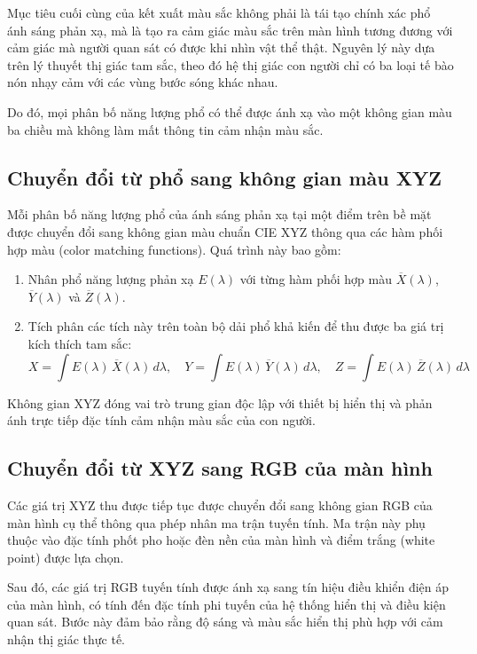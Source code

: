 Mục tiêu cuối cùng của kết xuất màu sắc không phải là tái tạo chính xác phổ ánh sáng phản xạ, mà là tạo ra cảm giác màu sắc trên màn hình tương đương với cảm giác mà người quan sát có được khi nhìn vật thể thật. Nguyên lý này dựa trên lý thuyết thị giác tam sắc, theo đó hệ thị giác con người chỉ có ba loại tế bào nón nhạy cảm với các vùng bước sóng khác nhau.

Do đó, mọi phân bố năng lượng phổ có thể được ánh xạ vào một không gian màu ba chiều mà không làm mất thông tin cảm nhận màu sắc.

\subsection{Chuyển đổi từ phổ sang không gian màu XYZ}

Mỗi phân bố năng lượng phổ của ánh sáng phản xạ tại một điểm trên bề mặt được chuyển đổi sang không gian màu chuẩn CIE XYZ thông qua các hàm phối hợp màu (color matching functions). Quá trình này bao gồm:

\begin{enumerate}
	\item Nhân phổ năng lượng phản xạ $E(\lambda)$ với từng hàm phối hợp màu $\overline{X}(\lambda)$, $\overline{Y}(\lambda)$ và $\overline{Z}(\lambda)$.
	\item Tích phân các tích này trên toàn bộ dải phổ khả kiến để thu được ba giá trị kích thích tam sắc:
	\[
	X = \int E(\lambda)\,\overline{X}(\lambda)\,d\lambda,\quad
	Y = \int E(\lambda)\,\overline{Y}(\lambda)\,d\lambda,\quad
	Z = \int E(\lambda)\,\overline{Z}(\lambda)\,d\lambda
	\]
\end{enumerate}

Không gian XYZ đóng vai trò trung gian độc lập với thiết bị hiển thị và phản ánh trực tiếp đặc tính cảm nhận màu sắc của con người.

\subsection{Chuyển đổi từ XYZ sang RGB của màn hình}

Các giá trị XYZ thu được tiếp tục được chuyển đổi sang không gian RGB của màn hình cụ thể thông qua phép nhân ma trận tuyến tính. Ma trận này phụ thuộc vào đặc tính phốt pho hoặc đèn nền của màn hình và điểm trắng (white point) được lựa chọn.

Sau đó, các giá trị RGB tuyến tính được ánh xạ sang tín hiệu điều khiển điện áp của màn hình, có tính đến đặc tính phi tuyến của hệ thống hiển thị và điều kiện quan sát. Bước này đảm bảo rằng độ sáng và màu sắc hiển thị phù hợp với cảm nhận thị giác thực tế.

